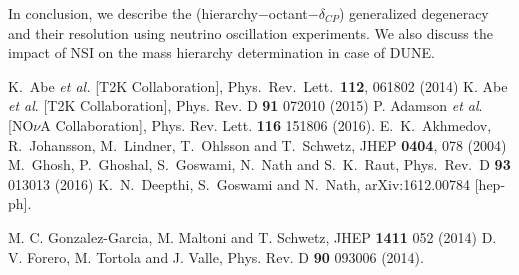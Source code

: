 \documentclass{svproc}
\begin{document}
In conclusion, we describe the (hierarchy$-$octant$-\delta_{CP} $) generalized degeneracy and their resolution using neutrino oscillation experiments. We also discuss the impact of NSI on the mass hierarchy determination in case of DUNE.
%
\begin{thebibliography}{6}
\vspace{-1mm}
%
  K.~Abe {\it et al.} [T2K Collaboration],
  Phys.\ Rev.\ Lett.\  {\bf 112}, 061802 (2014)
%
K. Abe {\it et al}. [T2K Collaboration],  Phys. Rev. D {\bf 91} 072010 (2015)
%
P. Adamson  {\it et al}. [NO$\nu$A Collaboration], Phys. Rev. Lett. {\bf 116} 151806 (2016). %
  E.~K.~Akhmedov, R.~Johansson, M.~Lindner, T.~Ohlsson and T.~Schwetz,
  JHEP {\bf 0404}, 078 (2004)
  M.~Ghosh, P.~Ghoshal, S.~Goswami, N.~Nath and S.~K.~Raut,
  Phys.\ Rev.\ D {\bf 93} 013013 (2016)
  K.~N.~Deepthi, S.~Goswami and N.~Nath,
  arXiv:1612.00784 [hep-ph].

M. C. Gonzalez-Garcia, M. Maltoni and T. Schwetz,  JHEP { \bf 1411} 052 (2014)
%
%
D. V. Forero, M. Tortola and J. Valle,  Phys. Rev.  D {\bf 90}  093006 (2014).


\end{thebibliography}
\end{document}
